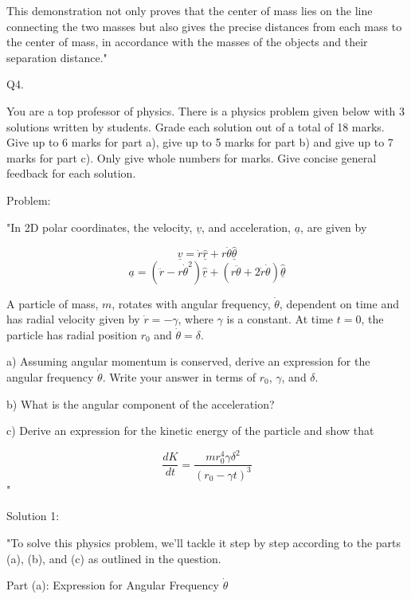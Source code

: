 This demonstration not only proves that the center of mass lies on the line connecting the two masses but also gives the precise distances from each mass to the center of mass, in accordance with the masses of the objects and their separation distance."



                           Q4. 

You are a top professor of physics. There is a physics problem given below with 3 solutions written by students. Grade each solution out of a total of 18 marks. Give up to 6 marks for part a), give up to 5 marks for part b) and give up to 7 marks for part c). Only give whole numbers for marks. Give concise general feedback for each solution.

Problem:

"In 2D polar coordinates, the velocity, \( \underline{v} \), and acceleration, \( \underline{a} \), are given by 

\[ 
\underline{v} = \dot{r} \underline{\hat{r}} + r \dot{\theta} \underline{\hat{\theta}} 
\]
\[ 
\underline{a} = (\ddot{r} - r \dot{\theta}^{2}) \underline{\hat{r}} + (r \ddot{\theta} + 2\dot{r}\dot{\theta} ) \underline{\hat{\theta}} 
\]
    
A particle of mass, \( m \), rotates with angular frequency, \( \dot{\theta} \), dependent on time and has radial velocity given by \( \dot{r} = - \gamma \), where \( \gamma \) is a constant. At time \( t = 0 \), the particle has radial position \( r_{0} \) and \( \dot{\theta} = \delta \). 
    
a) Assuming angular momentum is conserved, derive an expression for the angular frequency \( \dot{\theta} \). Write your answer in terms of \( r_{0} \), \( \gamma \), and \( \delta \).
    
b) What is the angular component of the acceleration?
    
c) Derive an expression for the kinetic energy of the particle and show that 
    
\[
\frac{dK}{dt} = \frac{m r_{0}^{4} \gamma \delta^{2}}{(r_{0} - \gamma t)^{3}}
\]"

Solution 1: 

"To solve this physics problem, we'll tackle it step by step according to the parts (a), (b), and (c) as outlined in the question.

Part (a): Expression for Angular Frequency \(\dot{\theta}\)

